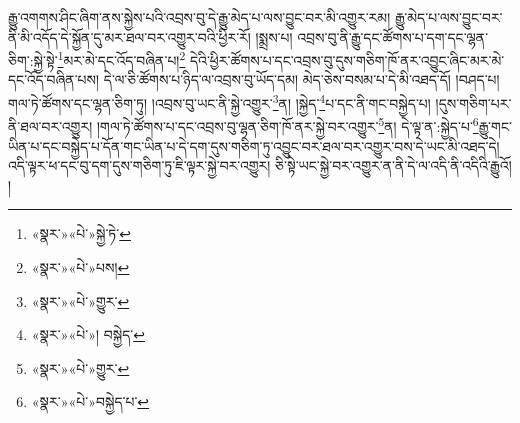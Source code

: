 རྒྱུ་འགགས་ཤིང་ཞིག་ནས་སྐྱེས་པའི་འབྲས་བུ་དེ་རྒྱུ་མེད་པ་ལས་བྱུང་བར་མི་འགྱུར་རམ། རྒྱུ་མེད་པ་ལས་བྱུང་བར་ནི་མི་འདོད་དེ་སྐྱོན་དུ་མར་ཐལ་བར་འགྱུར་བའི་ཕྱིར་རོ། །སྨྲས་པ། འབྲས་བུ་ནི་རྒྱུ་དང་ཚོགས་པ་དག་དང་ལྷན་ཅིག་:སྐྱེ་སྟེ་\footnote{«སྣར་»«པེ་»སྐྱེ་ཏེ་}མར་མེ་དང་འོད་བཞིན་པ།\footnote{«སྣར་»«པེ་»པས།} དེའི་ཕྱིར་ཚོགས་པ་དང་འབྲས་བུ་དུས་གཅིག་ཁོ་ནར་འབྱུང་ཞིང་མར་མེ་དང་འོད་བཞིན་པས། དེ་ལ་ཅི་ཚོགས་པ་ཉིད་ལ་འབྲས་བུ་ཡོད་དམ། མེད་ཅེས་བསམ་པ་དེ་མི་འཐད་དོ། །བཤད་པ། གལ་ཏེ་ཚོགས་དང་ལྷན་ཅིག་ཏུ། །འབྲས་བུ་ཡང་ནི་སྐྱེ་འགྱུར་\footnote{«སྣར་»«པེ་»གྱུར་}ན། །སྐྱེད་\footnote{«སྣར་»«པེ་»། བསྐྱེད་}པ་དང་ནི་གང་བསྐྱེད་པ། །དུས་གཅིག་པར་ནི་ཐལ་བར་འགྱུར། །གལ་ཏེ་ཚོགས་པ་དང་འབྲས་བུ་ལྷན་ཅིག་ཁོ་ནར་སྐྱེ་བར་འགྱུར་\footnote{«སྣར་»«པེ་»གྱུར་}ན། དེ་ལྟ་ན་:སྐྱེད་པ་\footnote{«སྣར་»«པེ་»བསྐྱེད་པ་}རྒྱུ་གང་ཡིན་པ་དང་བསྐྱེད་པ་དོན་གང་ཡིན་པ་དེ་དག་དུས་གཅིག་ཏུ་འབྱུང་བར་ཐལ་བར་འགྱུར་བས་དེ་ཡང་མི་འཐད་དེ། འདི་ལྟར་ཕ་དང་བུ་དག་དུས་གཅིག་ཏུ་ཇི་ལྟར་སྐྱེ་བར་འགྱུར། ཅི་སྟེ་ཡང་སྐྱེ་བར་འགྱུར་ན་ནི་དེ་ལ་འདི་ནི་འདིའི་རྒྱུའོ། །
